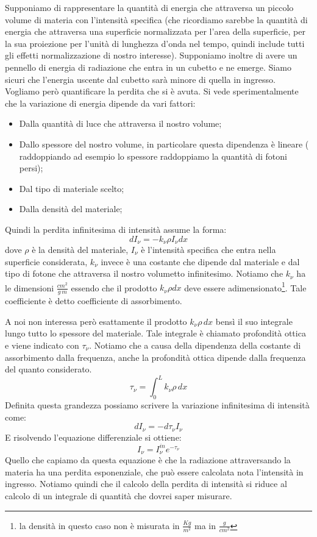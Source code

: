 \documentclass[a4paper,11pt]{article}
\begin{document}
    Supponiamo di rappresentare la quantità di energia che attraversa un piccolo volume di materia con l'intensità specifica (che ricordiamo sarebbe la quantità di energia che attraversa una superficie normalizzata per l'area della superficie, per la sua proiezione per l'unità di lunghezza d'onda nel tempo, quindi include tutti gli effetti normalizzazione di nostro interesse). Supponiamo inoltre di avere un pennello di energia di radiazione che entra in un cubetto e ne emerge. Siamo sicuri che l'energia uscente dal cubetto sarà minore di quella in ingresso. Vogliamo però quantificare la perdita che si è avuta. Si vede sperimentalmente che la variazione di energia dipende da vari fattori:
    
    \begin{itemize}
        \item Dalla quantità di luce che attraversa il nostro volume;
        \item Dallo spessore del nostro volume, in particolare questa dipendenza è lineare ( raddoppiando ad esempio lo spessore raddoppiamo la quantità di fotoni persi);
        \item Dal tipo di materiale scelto;
        \item Dalla densità del materiale;
    \end{itemize}
    
    Quindi la perdita infinitesima di intensità assume la forma: 
    $$
        dI_{\nu} = - k_{\nu} \rho I_{\nu} dx
    $$
    dove $\rho$ è la densità del materiale, $I_{\nu}$ è l'intensità specifica che entra nella superficie considerata, $k_{\nu}$ invece è una costante che dipende dal materiale e dal tipo di fotone che attraversa il nostro volumetto infinitesimo. Notiamo che $k_{\nu}$ ha le  dimensioni $\frac{cm^2}{g \, m}$ essendo che il prodotto
    $ k_{\nu} \rho dx$ deve essere adimensionato\footnote{la densità in questo caso non è misurata in $\frac{Kg}{m^2}$ ma in $\frac{g}{cm^2}$}. Tale coefficiente è detto coefficiente di assorbimento.

    A noi non interessa però esattamente il prodotto $ k_{\nu} \rho \, dx $ bensì il suo integrale lungo tutto lo spessore del materiale. Tale integrale è chiamato profondità ottica e viene indicato con $\tau_{\nu}$. Notiamo che a causa della dipendenza della costante di assorbimento dalla frequenza, anche la profondità ottica dipende dalla frequenza del quanto considerato. 
    $$
            \tau_{\nu} = \int_0^L k_{\nu} \rho \, dx        
    $$
    Definita questa grandezza possiamo scrivere la variazione infinitesima di intensità come: 
    $$
        dI_{\nu} = - d\tau_{\nu} I_{\nu}
    $$
    E risolvendo l'equazione differenziale si ottiene:
    $$
        I_{\nu} = I^{in}_{\nu} e^{- \tau_{\nu}}
    $$
    Quello che capiamo da questa equazione è che la radiazione attraversando la materia ha una perdita esponenziale, che può essere calcolata nota l'intensità in ingresso. Notiamo quindi che il calcolo della perdita di intensità si riduce al calcolo di un integrale di quantità che dovrei saper misurare.
\end{document}
